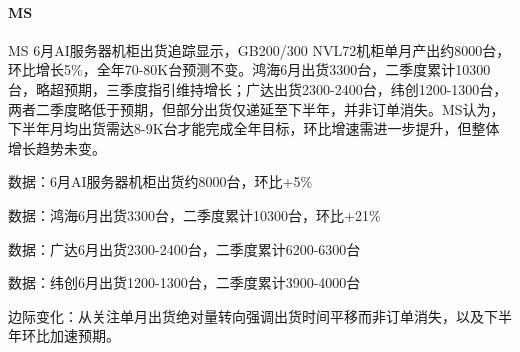 \documentclass[11pt]{ctexart}
\begin{document}
\paragraph{MS} MS 6月AI服务器机柜出货追踪显示，GB200/300 NVL72机柜单月产出约8000台，环比增长5\%，全年70-80K台预测不变。鸿海6月出货3300台，二季度累计10300台，略超预期，三季度指引维持增长；广达出货2300-2400台，纬创1200-1300台，两者二季度略低于预期，但部分出货仅递延至下半年，并非订单消失。MS认为，下半年月均出货需达8-9K台才能完成全年目标，环比增速需进一步提升，但整体增长趋势未变。
{\small\color{refgray}数据：6月AI服务器机柜出货约8000台，环比+5\%\par}
{\small\color{refgray}数据：鸿海6月出货3300台，二季度累计10300台，环比+21\%\par}
{\small\color{refgray}数据：广达6月出货2300-2400台，二季度累计6200-6300台\par}
{\small\color{refgray}数据：纬创6月出货1200-1300台，二季度累计3900-4000台\par}
{\small\color{refgray}边际变化：从关注单月出货绝对量转向强调出货时间平移而非订单消失，以及下半年环比加速预期。\par}
\end{document}
